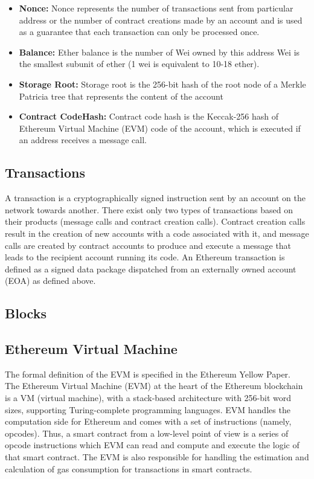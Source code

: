         \begin{itemize}
            \item \textbf{Nonce:} Nonce represents the number of transactions sent from particular address or the number of contract creations made by an account and is used as a guarantee that each transaction can only be processed once.
            \item \textbf{Balance:} Ether balance is the number of Wei owned by this address
                Wei is the smallest subunit of ether (1 wei is equivalent to 10-18 ether).
            \item \textbf{Storage Root:} Storage root is the 256-bit hash of the root node of a Merkle Patricia tree that represents the content of the account 
            \item \textbf{Contract CodeHash:} Contract code hash is the Keccak-256 hash of Ethereum Virtual Machine (EVM) code of the account, which is executed if an address receives a message call.
        \end{itemize}

    \subsection{Transactions}
    A transaction is a cryptographically signed instruction sent by an account on the network towards another.
    There exist only two types of transactions based on their products (message calls and contract creation calls).
    Contract creation calls result in the creation of new accounts with a code associated with it, and message calls are created by contract accounts to produce and execute a message that leads
    to the recipient account running its code.
    An Ethereum transaction is defined as a signed data package dispatched from an externally owned account (EOA) as defined above.

    \subsection{Blocks}

    \subsection{Ethereum Virtual Machine}
        The formal definition of the EVM is specified in the Ethereum Yellow Paper.~\cite{wood2014ethereum}
        The Ethereum Virtual Machine (EVM) at the heart of the Ethereum blockchain is a VM (virtual machine), with a stack-based architecture with 256-bit word sizes, supporting Turing-complete programming languages.
        EVM handles the computation side for Ethereum and comes with a set of instructions (namely, opcodes).
        Thus, a smart contract from a low-level point of view is a series of opcode instructions which EVM can read and compute and execute the logic of that smart contract.
        The EVM is also responsible for handling the estimation and calculation of gas consumption for transactions in smart contracts.


